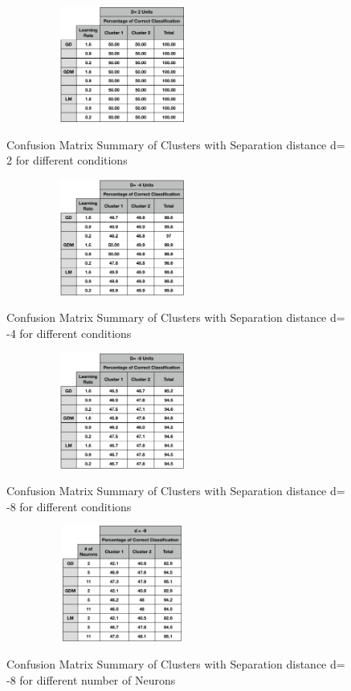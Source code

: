 \documentclass[conference]{IEEEtran}
\begin{document}
\begin{figure}[h!]
\centering
{\includegraphics[width=3in,height=1.5in,clip,keepaspectratio]{Confusion_Matrix_Summary_d2.png} }\\
\caption{Confusion Matrix Summary of Clusters with Separation distance d= 2 for different conditions}
\end{figure}
\begin{figure}[h!]
\centering
{\includegraphics[width=3in,height=1.5in,clip,keepaspectratio]{Confusion_Matrix_Summary_d4.png} }\\
\caption{Confusion Matrix Summary of Clusters with Separation distance d= -4 for different conditions}
\end{figure}
\begin{figure}[h!]
\centering
{\includegraphics[width=3in,height=1.5in,clip,keepaspectratio]{Confusion_Matrix_Summary_d8.png} }\\
\caption{Confusion Matrix Summary of Clusters with Separation distance d= -8 for different conditions}
\end{figure}
\begin{figure}[h!]
\centering
{\includegraphics[width=3in,height=1.5in,clip,keepaspectratio]{Cms_dn.png} }\\
\begin{center}
\caption{Confusion Matrix Summary of Clusters with Separation distance d= -8 for different  number of Neurons}
\end{center}
\end{figure}
\end{document}
